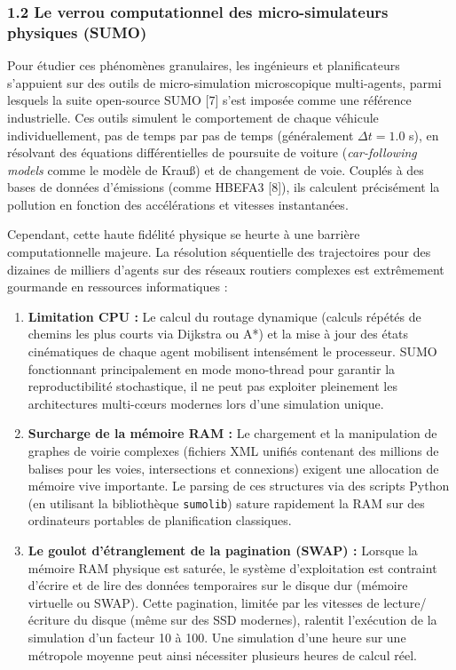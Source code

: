 \documentclass[10pt, a4paper]{article}
\providecommand{\tightlist}{}
\begin{document}
\subsubsection{1.2 Le verrou computationnel des micro-simulateurs
physiques
(SUMO)}\label{le-verrou-computationnel-des-micro-simulateurs-physiques-sumo}

Pour étudier ces phénomènes granulaires, les ingénieurs et
planificateurs s'appuient sur des outils de micro-simulation
microscopique multi-agents, parmi lesquels la suite open-source SUMO
{[}7{]} s'est imposée comme une référence industrielle. Ces outils
simulent le comportement de chaque véhicule individuellement, pas de
temps par pas de temps (généralement \(\Delta t = 1.0\) s), en résolvant
des équations différentielles de poursuite de voiture
(\emph{car-following models} comme le modèle de Krauß) et de changement
de voie. Couplés à des bases de données d'émissions (comme HBEFA3
{[}8{]}), ils calculent précisément la pollution en fonction des
accélérations et vitesses instantanées.

Cependant, cette haute fidélité physique se heurte à une barrière
computationnelle majeure. La résolution séquentielle des trajectoires
pour des dizaines de milliers d'agents sur des réseaux routiers
complexes est extrêmement gourmande en ressources informatiques :

\begin{enumerate}
\def\labelenumi{\arabic{enumi}.}
\tightlist
\item
  \textbf{Limitation CPU :} Le calcul du routage dynamique (calculs
  répétés de chemins les plus courts via Dijkstra ou A*) et la mise à
  jour des états cinématiques de chaque agent mobilisent intensément le
  processeur. SUMO fonctionnant principalement en mode mono-thread pour
  garantir la reproductibilité stochastique, il ne peut pas exploiter
  pleinement les architectures multi-cœurs modernes lors d'une
  simulation unique.
\item
  \textbf{Surcharge de la mémoire RAM :} Le chargement et la
  manipulation de graphes de voirie complexes (fichiers XML unifiés
  contenant des millions de balises pour les voies, intersections et
  connexions) exigent une allocation de mémoire vive importante. Le
  parsing de ces structures via des scripts Python (en utilisant la
  bibliothèque \texttt{sumolib}) sature rapidement la RAM sur des
  ordinateurs portables de planification classiques.
\item
  \textbf{Le goulot d'étranglement de la pagination (SWAP) :} Lorsque la
  mémoire RAM physique est saturée, le système d'exploitation est
  contraint d'écrire et de lire des données temporaires sur le disque
  dur (mémoire virtuelle ou SWAP). Cette pagination, limitée par les
  vitesses de lecture/écriture du disque (même sur des SSD modernes),
  ralentit l'exécution de la simulation d'un facteur 10 à 100. Une
  simulation d'une heure sur une métropole moyenne peut ainsi nécessiter
  plusieurs heures de calcul réel.
\end{enumerate}
\end{document}
